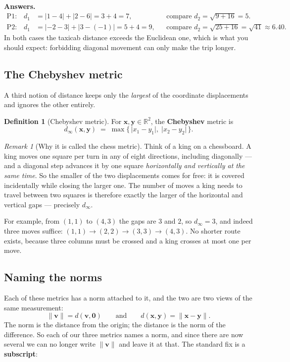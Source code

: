 \documentclass[11pt]{article}
\theoremstyle{definition}
\newtheorem{defn}{Definition}[section]
\theoremstyle{remark}
\newtheorem*{rmk}{Remark}
\newcommand{\R}{\mathbb{R}}
\newcommand{\vc}[1]{\mathbf{#1}}
\newcommand{\norm}[1]{\lVert #1\rVert}
\begin{document}
\smallskip
\noindent\textbf{Answers.}
\begin{align*}
  \text{P1:}\quad d_1 &= \lvert 1-4\rvert+\lvert 2-6\rvert = 3+4 = 7,
    &&\text{compare } d_2=\sqrt{9+16}=5 . \\
  \text{P2:}\quad d_1 &= \lvert -2-3\rvert+\lvert 3-(-1)\rvert = 5+4 = 9,
    &&\text{compare } d_2=\sqrt{25+16}=\sqrt{41}\approx 6.40 .
\end{align*}
In both cases the taxicab distance exceeds the Euclidean one, which is what you
should expect: forbidding diagonal movement can only make the trip longer.

\subsection{The Chebyshev metric}
A third notion of distance keeps only the \emph{largest} of the coordinate
displacements and ignores the other entirely.

\begin{defn}[Chebyshev metric]
For $\vc{x},\vc{y}\in\R^{2}$, the \textbf{Chebyshev} metric is
\[
  d_\infty(\vc{x},\vc{y})
  \;=\; \max\bigl\{\,\lvert x_1-y_1\rvert,\;\lvert x_2-y_2\rvert\,\bigr\}.
\]
\end{defn}

\begin{rmk}[Why it is called the chess metric]
Think of a king on a chessboard. A king moves one square per turn in any of
eight directions, including diagonally --- and a diagonal step advances it by
one square \emph{horizontally and vertically at the same time}. So the smaller
of the two displacements comes for free: it is covered incidentally while
closing the larger one. The number of moves a king needs to travel between two
squares is therefore exactly the larger of the horizontal and vertical gaps ---
precisely $d_\infty$.

For example, from $(1,1)$ to $(4,3)$ the gaps are $3$ and $2$, so
$d_\infty=3$, and indeed three moves suffice:
$(1,1)\to(2,2)\to(3,3)\to(4,3)$. No shorter route exists, because three columns
must be crossed and a king crosses at most one per move.
\end{rmk}

\subsection{Naming the norms}
Each of these metrics has a norm attached to it, and the two are two views of
the same measurement:
\[
  \norm{\vc{v}} = d(\vc{v},\vc{0})
  \qquad\text{and}\qquad
  d(\vc{x},\vc{y}) = \norm{\vc{x}-\vc{y}} .
\]
The norm is the distance from the origin; the distance is the norm of the
difference. So each of our three metrics names a norm, and since there are now
several we can no longer write $\norm{\vc{v}}$ and leave it at that. The
standard fix is a \textbf{subscript}:
\end{document}
